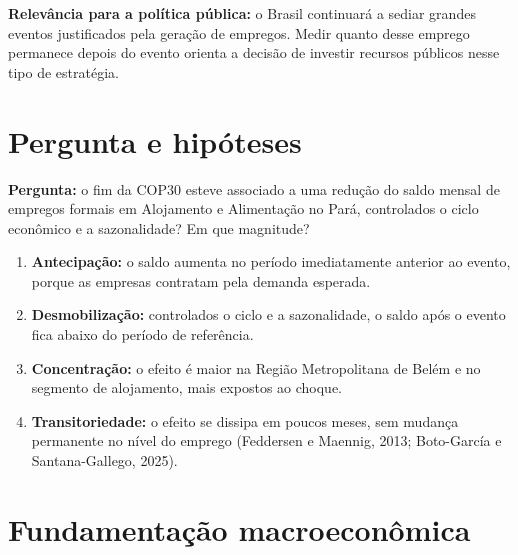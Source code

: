 \textbf{Relevância para a política pública:} o Brasil continuará a sediar grandes eventos
justificados pela geração de empregos. Medir quanto desse emprego permanece depois do evento orienta
a decisão de investir recursos públicos nesse tipo de estratégia.


\section{Pergunta e hipóteses}

\textbf{Pergunta:} o fim da COP30 esteve associado a uma redução do saldo mensal de empregos formais
em Alojamento e Alimentação no Pará, controlados o ciclo econômico e a sazonalidade? Em que magnitude?

\begin{enumerate}[label=\textbf{H\arabic*.}, leftmargin=*]
  \item \textbf{Antecipação:} o saldo aumenta no período imediatamente anterior ao evento, porque as
        empresas contratam pela demanda esperada.
  \item \textbf{Desmobilização:} controlados o ciclo e a sazonalidade, o saldo após o evento fica abaixo
        do período de referência.
  \item \textbf{Concentração:} o efeito é maior na Região Metropolitana de Belém e no segmento de
        alojamento, mais expostos ao choque.
  \item \textbf{Transitoriedade:} o efeito se dissipa em poucos meses, sem mudança permanente no nível do
        emprego (Feddersen e Maennig, 2013; Boto-García e Santana-Gallego, 2025).
\end{enumerate}


\section{Fundamentação macroeconômica}

